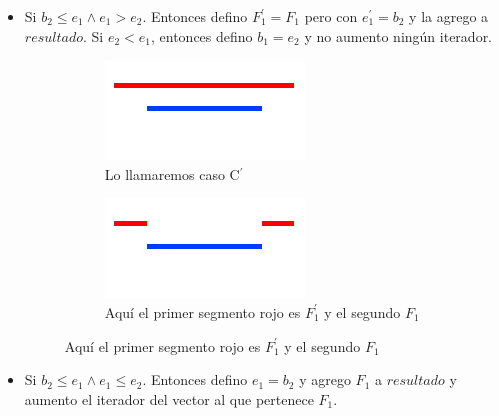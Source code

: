 \begin{itemize}
\begin{itemize}
            \item Si $b_{2} \leq e_{1} \land e_{1} > e_{2}$. Entonces defino $F_{1}^{\prime} = F_{1}$ pero con $e_{1}^{\prime} = b_{2}$ y la agrego a $resultado$. Si $e_{2} < e_{1}$, entonces defino $b_{1} = e_{2}$ y no aumento ningún iterador.
            \begin{figure}[H]
        		\centering
				\begin{subfigure}[b]{0.25\textwidth}
                	\includegraphics[width=\textwidth]{imagenes/ej2-c2.jpg}
                	\caption*{Lo llamaremos caso C$^{\prime}$}
        		\end{subfigure}%

				\begin{subfigure}[b]{0.25\textwidth}
                	\includegraphics[width=\textwidth]{imagenes/ej2-c3.jpg}
                	\caption*{Aquí el primer segmento rojo es $F_{1}^{\prime}$ y el segundo $F_{1}$}
        		\end{subfigure}%
			\end{figure}

            \item Si $b_{2} \leq e_{1} \land e_{1} \leq e_{2}$. Entonces defino $e_{1} = b_{2}$ y agrego $F_{1}$ a $resultado$ y aumento el iterador del vector al que pertenece $F_{1}$.


\end{itemize}
\end{itemize}

